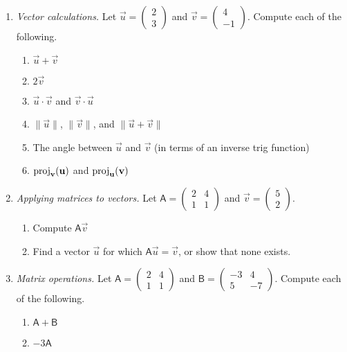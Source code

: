 \begin{enumerate}
\item \emph{Vector calculations.} Let $\vec{u} = \begin{pmatrix} 2 \\ 3 \end{pmatrix}$ and $\vec{v} = \begin{pmatrix} 4 \\ -1 \end{pmatrix}$. Compute each of the following.
\begin{enumerate}
\item $\vec{u} + \vec{v}$
\item $2\vec{v}$
\item $\vec{u}\cdot\vec{v}$ and $\vec{v}\cdot\vec{u}$
\item $\|\vec{u}\|$, $\|\vec{v}\|$, and $\|\vec{u} + \vec{v}\|$
\item The angle between $\vec{u}$ and $\vec{v}$ (in terms of an inverse trig function)
\item $\operatorname{proj}_{\mathbf{v}}(\mathbf{u})$ and $\operatorname{proj}_{\mathbf{u}}(\mathbf{v})$
\end{enumerate}
\item \emph{Applying matrices to vectors.} Let $\mathsf{A} = \begin{pmatrix} 2 & 4 \\ 1 & 1 \end{pmatrix}$ and $\vec{v} = \begin{pmatrix} 5 \\ 2 \end{pmatrix}$.
\begin{enumerate}
\item Compute $\mathsf{A}\vec{v}$
\item Find a vector $\vec{u}$ for which $\mathsf{A}\vec{u} = \vec{v}$, or show that none exists.
\end{enumerate}
\item \emph{Matrix operations.} Let $\mathsf{A} = \begin{pmatrix} 2 & 4 \\ 1 & 1 \end{pmatrix}$ and $\mathsf{B} = \begin{pmatrix} -3 & 4 \\ 5 & -7 \end{pmatrix}$. Compute each of the following.
\begin{enumerate}
\item $\mathsf{A} + \mathsf{B}$
\item $-3\mathsf{A}$

\end{enumerate}
\end{enumerate}

